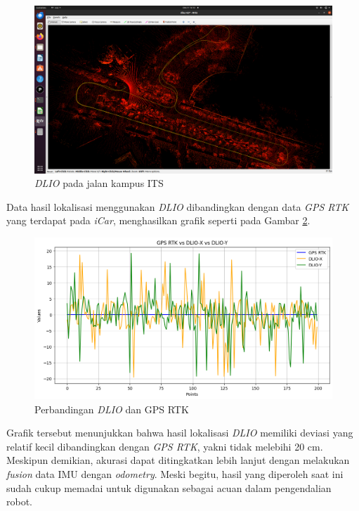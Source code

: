 \begin{figure}[H] 
  \centering
  \includegraphics[scale=0.22]{gambar/dlio_its.png}
  \caption{\emph{DLIO} pada jalan kampus ITS}
  \label{fig:DLIO pada jalan kampus ITS}
\end{figure}

Data hasil lokalisasi menggunakan \emph{DLIO} dibandingkan dengan data \emph{GPS RTK} yang terdapat pada \emph{iCar}, menghasilkan grafik seperti pada Gambar \ref{fig:Perbandingan DLIO dan GPS RTK}.

\begin{figure}[H] 
    \centering
    \includegraphics[scale=0.62]{gambar/gpsvsdlio.png}
    \caption{Perbandingan \emph{DLIO} dan GPS RTK}
    \label{fig:Perbandingan DLIO dan GPS RTK}
\end{figure}

Grafik tersebut menunjukkan bahwa hasil lokalisasi \emph{DLIO} memiliki deviasi yang relatif kecil dibandingkan dengan \emph{GPS RTK}, yakni tidak melebihi 20 cm. Meskipun demikian, akurasi dapat ditingkatkan lebih lanjut dengan melakukan \emph{fusion} data IMU dengan \emph{odometry}. Meski begitu, hasil yang diperoleh saat ini sudah cukup memadai untuk digunakan sebagai acuan dalam pengendalian robot.

